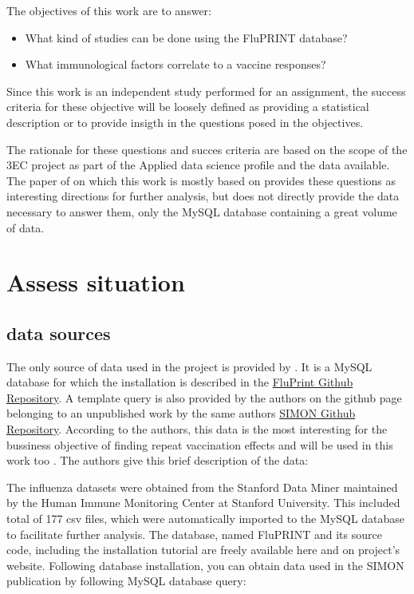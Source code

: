 The objectives of this work are to answer:
\begin{itemize}
        \item What kind of studies can be done using the FluPRINT database?
        \item What immunological factors correlate to a vaccine responses?
\end{itemize}

Since this work is an independent study performed for an assignment, the
success criteria for these objective will be loosely defined as providing a
statistical description or to provide insigth in the questions posed in the
objectives.

The rationale for these questions and succes criteria  are based on the scope
of the 3EC project as part of the Applied data science profile and the data
available. The paper of \cite{tomicFluPRINTDatasetMultidimensional2019} on
which this work is mostly based on provides these questions as interesting
directions for further analysis, but does not directly provide the data
necessary to answer them, only the MySQL database containing a great volume of
data.

\section{Assess situation}

\subsection{data sources}

The only source of data used in the project is provided by
\cite{tomicFluPRINTDatasetMultidimensional2019}. It is a MySQL database for
which the installation is described in the
\href{https://github.com/LogIN-/fluprint}{FluPrint Github Repository}. A
template query is also provided by the authors on the github page belonging to
an unpublished work by the same authors
\href{https://github.com/LogIN-/simon-manuscript}{SIMON Github Repository}.
According to the authors, this data is the most interesting for the bussiness
objective of finding repeat vaccination effects and will be used in this work
too \cite{tomicSIMONAutomatedMachine2019}. The authors give this brief
description of the data:

\begin{displayquote}
The influenza datasets were obtained from the Stanford Data Miner maintained by
    the Human Immune Monitoring Center at Stanford University. This included
    total of 177 csv files, which were automatically imported to the MySQL
    database to facilitate further analysis. The database, named FluPRINT and
    its source code, including the installation tutorial are freely available
    here and on project's website. Following database installation, you can
    obtain data used in the SIMON publication by following MySQL database
    query:
\end{displayquote}

